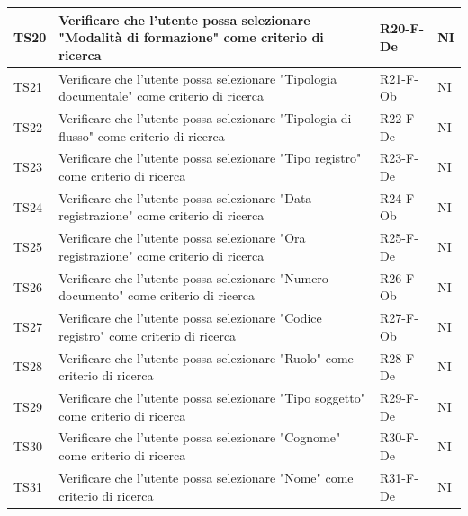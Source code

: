 \documentclass[a4paper,12pt]{article}
\begin{document}
\begin{longtable}{|M{1.2cm}|M{6.3cm}|M{2.5cm}|M{1.5cm}|}
                TS20 & Verificare che l'utente possa selezionare "Modalità di formazione" come criterio di ricerca & R20-F-De & NI \\
                \hline

                TS21 & Verificare che l'utente possa selezionare "Tipologia documentale" come criterio di ricerca & R21-F-Ob & NI \\
                \hline

                TS22 & Verificare che l'utente possa selezionare "Tipologia di flusso" come criterio di ricerca & R22-F-De & NI \\
                \hline

                TS23 & Verificare che l'utente possa selezionare "Tipo registro" come criterio di ricerca & R23-F-De & NI \\
                \hline
               
                TS24 & Verificare che l'utente possa selezionare "Data registrazione" come criterio di ricerca & R24-F-Ob & NI \\
                \hline
                
                TS25 & Verificare che l'utente possa selezionare "Ora registrazione" come criterio di ricerca & R25-F-De & NI \\
                \hline
                
                TS26 & Verificare che l'utente possa selezionare "Numero documento" come criterio di ricerca & R26-F-Ob & NI \\
                \hline

                TS27 & Verificare che l'utente possa selezionare "Codice registro" come criterio di ricerca & R27-F-Ob & NI \\
                \hline

                TS28 & Verificare che l'utente possa selezionare "Ruolo" come criterio di ricerca & R28-F-De & NI \\
                \hline

                TS29 & Verificare che l'utente possa selezionare "Tipo soggetto" come criterio di ricerca & R29-F-De & NI \\
                \hline

                TS30 & Verificare che l'utente possa selezionare "Cognome" come criterio di ricerca & R30-F-De & NI \\
                \hline

                TS31 & Verificare che l'utente possa selezionare "Nome" come criterio di ricerca & R31-F-De & NI \\
                \hline


\end{longtable}
\end{document}
